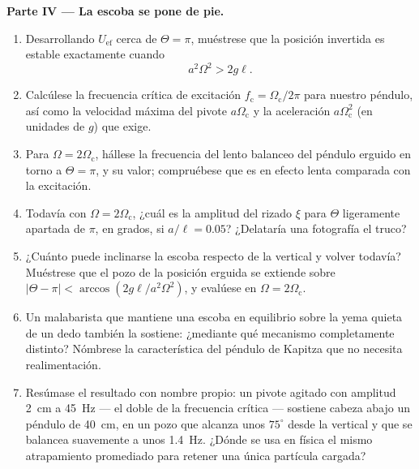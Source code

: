 \begin{problem}
\medskip\noindent\textbf{Parte IV --- La escoba se pone de pie.}
\begin{enumerate}[resume]
  \item Desarrollando $U_{\text{ef}}$ cerca de $\Theta = \pi$, muéstrese
        que la posición invertida es estable exactamente cuando
        \[
        a^2\Omega^2 > 2g\ell .
        \]
  \item Calcúlese la frecuencia crítica de excitación $f_{\text{c}} =
        \Omega_{\text{c}}/2\pi$ para nuestro péndulo, así como la velocidad
        máxima del pivote $a\Omega_{\text{c}}$ y la aceleración
        $a\Omega_{\text{c}}^2$ (en unidades de $g$) que exige.
  \item Para $\Omega = 2\Omega_{\text{c}}$, hállese la frecuencia del lento
        balanceo del péndulo erguido en torno a $\Theta = \pi$, y su
        valor; compruébese que es en efecto lenta comparada con la
        excitación.
  \item Todavía con $\Omega = 2\Omega_{\text{c}}$, ¿cuál es la amplitud del
        rizado $\xi$ para $\Theta$ ligeramente apartada de $\pi$, en
        grados, si $a/\ell = 0.05$? ¿Delataría una fotografía el truco?
  \item ¿Cuánto puede inclinarse la escoba respecto de la vertical y volver
        todavía? Muéstrese que el pozo de la posición erguida se extiende
        sobre $|\Theta - \pi| <
        \arccos(2g\ell/a^2\Omega^2)$, y evalúese en $\Omega =
        2\Omega_{\text{c}}$.
  \item Un malabarista que mantiene una escoba en equilibrio sobre la yema
        quieta de un dedo también la sostiene: ¿mediante qué mecanismo
        completamente distinto? Nómbrese la característica del péndulo de
        Kapitza que no necesita realimentación.
  \item Resúmase el resultado con nombre propio: un pivote agitado con
        amplitud \qty{2}{cm} a \qty{45}{Hz} --- el doble de la frecuencia
        crítica --- sostiene cabeza abajo un péndulo de \qty{40}{cm}, en
        un pozo que alcanza unos $75^\circ$ desde la vertical y que se
        balancea suavemente a unos \qty{1.4}{Hz}. ¿Dónde se usa en física
        el mismo atrapamiento promediado para retener una única partícula
        cargada?
\end{enumerate}
\end{problem}

